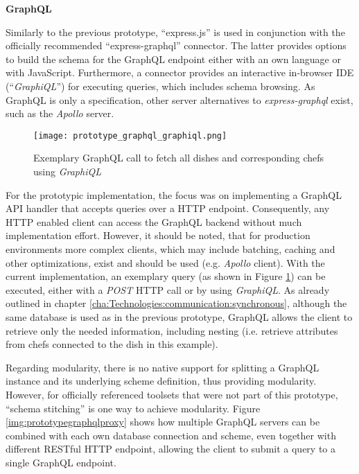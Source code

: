 \pagebreak
\textbf{GraphQL}

Similarly to the previous prototype, \enquote{express.js} is used in conjunction with the officially recommended \enquote{express-graphql} connector.
The latter provides options to build the schema for the GraphQL endpoint either with an own language or with JavaScript.
Furthermore, a connector provides an interactive in-browser \ac{IDE} (\enquote{\textit{GraphiQL}}) for executing queries, which includes schema browsing.
As GraphQL is only a specification, other server alternatives to \textit{express-graphql} exist, such as the \textit{Apollo} server.

\begin{figure}
	\centering
	\texttt{[image: prototype\_graphql\_graphiql.png]}
	\caption{Exemplary GraphQL call to fetch all dishes and corresponding chefs using \textit{GraphiQL}}
	\label{img:prototypegraphiql}
\end{figure}

For the prototypic implementation, the focus was on implementing a GraphQL \ac{API} handler that accepts queries over a \ac{HTTP} endpoint.
Consequently, any \ac{HTTP} enabled client can access the GraphQL backend without much implementation effort.
However, it should be noted, that for production environments more complex clients, which may include batching, caching and other optimizations, exist and should be used (e.g. \textit{Apollo} client).
With the current implementation, an exemplary query (as shown in Figure \ref{img:prototypegraphiql}) can be executed, either with a \textit{POST} \ac{HTTP} call or by using \textit{GraphiQL}.
As already outlined in chapter \ref{cha:Technologies:communication:synchronous}, although the same database is used as in the previous prototype, GraphQL allows the client to retrieve only the needed information, including nesting (i.e. retrieve attributes from chefs connected to the dish in this example).

Regarding modularity, there is no native support for splitting  a GraphQL instance and its underlying scheme definition, thus providing modularity.
However, for officially referenced toolsets that were not part of this prototype, \enquote{schema stitching} is one way to achieve modularity.
Figure \ref{img:prototypegraphqlproxy} shows how multiple GraphQL servers can be combined with each own database connection and scheme, even together with different RESTful \ac{HTTP} endpoint, allowing the client to submit a query to a single GraphQL endpoint.


